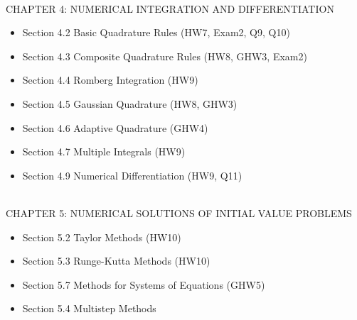 \documentclass[11pt]{amsart}
\begin{document}
\ \\
CHAPTER 4: NUMERICAL INTEGRATION AND DIFFERENTIATION \\
\begin{itemize}[leftmargin=*]
\item Section 4.2 Basic Quadrature Rules (HW7, Exam2, Q9, Q10)
\item Section 4.3 Composite Quadrature Rules (HW8, GHW3, Exam2)
\item Section 4.4 Romberg Integration (HW9)
\item Section 4.5 Gaussian Quadrature (HW8, GHW3)
\item Section 4.6 Adaptive Quadrature (GHW4)
\item Section 4.7 Multiple Integrals (HW9)
\item Section 4.9 Numerical Differentiation (HW9, Q11)
\end{itemize}
\ \\
CHAPTER 5: NUMERICAL SOLUTIONS OF INITIAL VALUE PROBLEMS \\
\begin{itemize}[leftmargin=*]
\item Section 5.2 Taylor Methods (HW10)
\item Section 5.3 Runge-Kutta Methods (HW10)
\item Section 5.7 Methods for Systems of Equations (GHW5)
\item Section 5.4 Multistep Methods
\end{itemize}
\ \\
\end{document}
